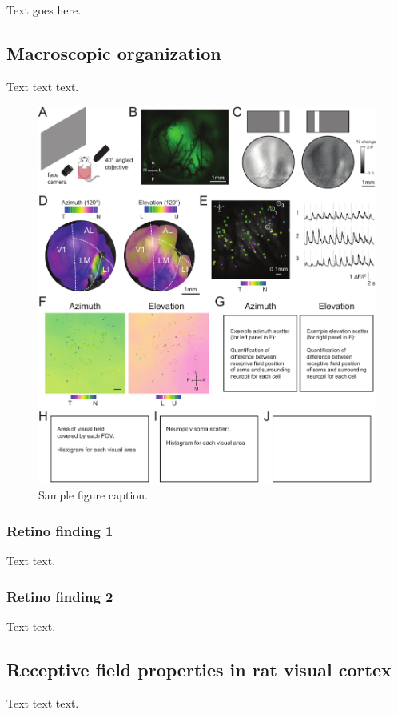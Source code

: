 \documentclass{article}
\begin{document}
Text goes here.

\subsection{Macroscopic organization}
Text text text.

\begin{figure}[ht]
  \centering
  \includegraphics{figures/retino.pdf}
  \caption{Sample figure caption.}
  \label{fig:fig1}
\end{figure}

\subsubsection{Retino finding 1}
Text text. 

\subsubsection{Retino finding 2}
Text text. 



\subsection{Receptive field properties in rat visual cortex}
Text text text.
\end{document}
